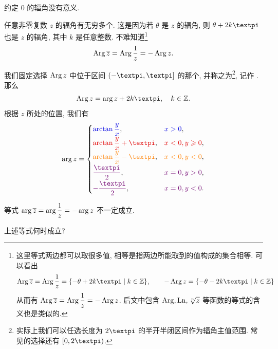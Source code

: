   \alert{约定 $0$ 的辐角没有意义.}

任意非零复数 $z$ 的辐角有无穷多个.
这是因为若 $\theta$ 是 $z$ 的辐角, 则 $\theta+2k\cpi$ 也是 $z$ 的辐角, 其中 $k$ 是任意整数.
不难知道\footnote{%
这里等式两边都可以取很多值, 相等是指两边所能取到的值构成的集合相等.
可以看出
\[
  \Arg\ov z=\Arg\frac1z=\{-\theta+2k\cpi\mid k\in\BZ\},\qquad
  -\Arg z=\{-\theta-2k\cpi\mid k\in\BZ\}
\]
从而有 $\operatorname{Arg} \overline z=\operatorname{Arg}\dfrac1z=-\operatorname{Arg} z$.
后文中包含 $\operatorname{Arg},\operatorname{Ln},\sqrt[n]{z}$ 等函数的等式的含义也是类似的.
}
\[
  \operatorname{Arg} \overline z=\operatorname{Arg}\frac1z=-\operatorname{Arg} z.
\]

我们固定选择 $\operatorname{Arg} z$ 中位于区间 $(-\cpi,\cpi]$ 的那个, 并称之为\footnote{%
  实际上我们可以任选长度为 $2\cpi$ 的半开半闭区间作为辐角主值范围. 常见的选择还有 $[0,2\cpi)$.
}, 记作 .
那么
\[
  \Arg z=\arg z+2k\cpi, \quad k\in\BZ.
\]
根据 $z$ 所处的位置, 我们有
\begin{equation}
  \label{eq:arg}
  \arg z=\begin{cases}
    {\color{main}\arctan\dfrac yx},&
      {\color{main}x>0},\\[4pt]
    {\color{second}\arctan\dfrac yx+\cpi},&
      {\color{second}x<0,y\ge0},\\[4pt]
    {\color{fifth}\arctan\dfrac yx-\cpi},&
      {\color{fifth}x<0,y<0},\\[4pt]
    {\color{third}\dfrac\cpi2},&
      {\color{third}x=0,y>0},\\[4pt]
    {\color{third}-\dfrac\cpi2},&
      {\color{third}x=0,y<0}.
  \end{cases}
\end{equation}

  \alert{等式 $\arg\overline z=\arg\dfrac1z=-\arg z$ 不一定成立.}

\begin{exercise}
  上述等式何时成立?  
\end{exercise}

